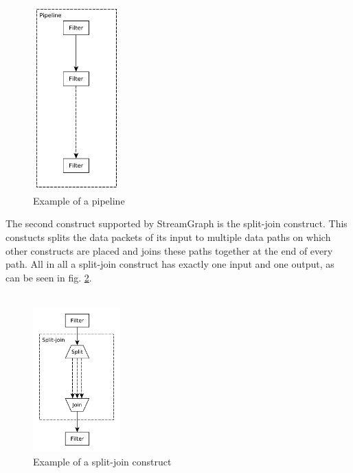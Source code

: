 \documentclass[journal]{IEEEtran}
\begin{document}
\begin{figure}[h]
	\centering
	\includegraphics[width=0.3\textwidth]{PipelineGraphic}
	\caption{Example of a pipeline}
	\label{fig_Pipeline}
\end{figure}


\noindent The second construct supported by StreamGraph is the split-join construct. 
This constucts splits the data packets of its input to multiple data paths on which
other constructs are placed and joins these paths together at the end of every
path. All in all a split-join construct has exactly one input and one output, as can 
be seen in fig. \ref{fig_Split_Join}.\\
\\

\begin{figure}[h]
	\centering
	\includegraphics[width=0.3\textwidth]{SplitJoinGraphic}
	\caption{Example of a split-join construct}
	\label{fig_Split_Join}
\end{figure}
\end{document}
